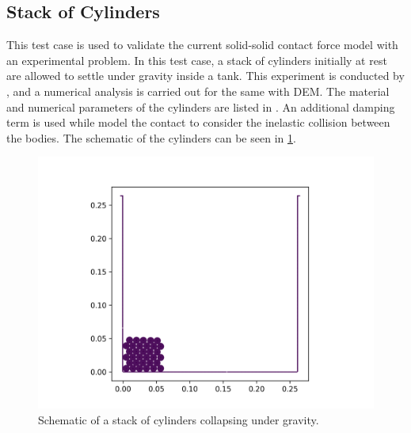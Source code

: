 \FloatBarrier%
\subsection{Stack of Cylinders}
\label{sec:stack-of-cylinders}
This test case is used to validate the current solid-solid contact force model
with an experimental problem. In this test case, a stack of cylinders initially
at rest are allowed to settle under gravity inside a tank. This experiment is
conducted by \citep{zhang_simulation_2009}, and a numerical analysis is carried
out for the same with DEM. The material and numerical parameters of the
cylinders are listed in . An additional damping
term is used while model the contact to consider the inelastic collision between
the bodies. The schematic of the cylinders can be seen in
\cref{fig:schematic:stack-of-cylinders}.
\begin{figure}[!htpb]
  \centering
  \includegraphics[scale=0.5]{figures/rfc/figures/stack_of_cylinders_2d/Mohseni_Vyas/time0}
  \caption{Schematic of a stack of cylinders collapsing under gravity.}
  \label{fig:schematic:stack-of-cylinders}
\end{figure}

